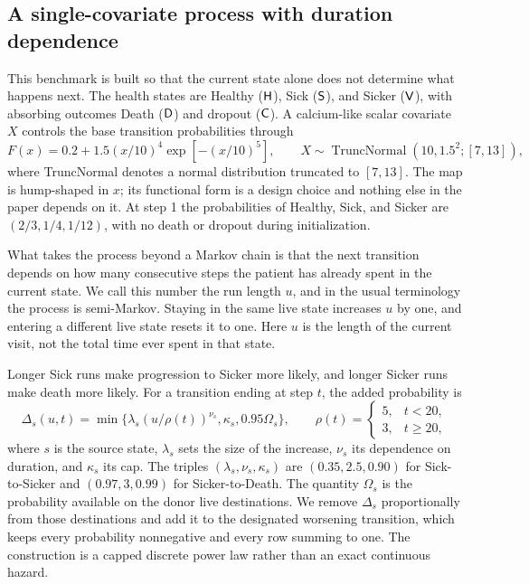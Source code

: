 \subsection{A single-covariate process with duration dependence}
This benchmark is built so that the current state alone does not determine what happens next. The health states are Healthy ($\mathsf H$), Sick ($\mathsf S$), and Sicker ($\mathsf V$), with absorbing outcomes Death ($\mathsf D$) and dropout ($\mathsf C$). A calcium-like scalar covariate $X$ controls the base transition probabilities through
\[
F(x)=0.2+1.5(x/10)^4\exp[-(x/10)^5],\qquad
X\sim\operatorname{TruncNormal}(10,1.5^2;[7,13]),
\]
where TruncNormal denotes a normal distribution truncated to $[7,13]$. The map is hump-shaped in $x$; its functional form is a design choice and nothing else in the paper depends on it. At step 1 the probabilities of Healthy, Sick, and Sicker are $(2/3,1/4,1/12)$, with no death or dropout during initialization.

What takes the process beyond a Markov chain is that the next transition depends on how many consecutive steps the patient has already spent in the current state. We call this number the run length $u$, and in the usual terminology the process is semi-Markov. Staying in the same live state increases $u$ by one, and entering a different live state resets it to one. Here $u$ is the length of the current visit, not the total time ever spent in that state.

Longer Sick runs make progression to Sicker more likely, and longer Sicker runs make death more likely. For a transition ending at step $t$, the added probability is
\begin{equation}\label{eq:ramp}
\Delta_s(u,t)=\min\{\lambda_s(u/\rho(t))^{\nu_s},\kappa_s,0.95\Omega_s\},
\qquad \rho(t)=\begin{cases}5,&t<20,\\3,&t\ge20,\end{cases}
\end{equation}
where $s$ is the source state, $\lambda_s$ sets the size of the increase, $\nu_s$ its dependence on duration, and $\kappa_s$ its cap. The triples $(\lambda_s,\nu_s,\kappa_s)$ are $(0.35,2.5,0.90)$ for Sick-to-Sicker and $(0.97,3,0.99)$ for Sicker-to-Death. The quantity $\Omega_s$ is the probability available on the donor live destinations. We remove $\Delta_s$ proportionally from those destinations and add it to the designated worsening transition, which keeps every probability nonnegative and every row summing to one. The construction is a capped discrete power law rather than an exact continuous hazard.

